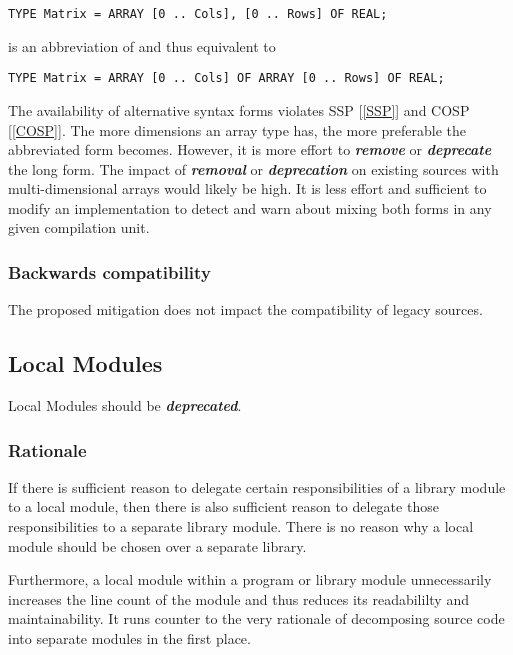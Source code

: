 \documentclass[10pt,a4paper]{article}
\renewcommand{\emph}[1]{\textbf{\textit{#1}}}
\begin{document}
\lstset{style=modula2}
\begin{lstlisting}
TYPE Matrix = ARRAY [0 .. Cols], [0 .. Rows] OF REAL;
\end{lstlisting}

\noindent is an abbreviation of and thus equivalent to 
\lstset{style=modula2}
\begin{lstlisting}
TYPE Matrix = ARRAY [0 .. Cols] OF ARRAY [0 .. Rows] OF REAL;
\end{lstlisting}

\par\noindent The availability of alternative syntax forms violates
SSP [\ref{SSP}] and COSP [\ref{COSP}]. The more dimensions an array type has,
the more preferable the abbreviated form becomes. However, it is more effort
to \emph{remove} or \emph{deprecate} the long form. The impact of
\emph{removal} or \emph{deprecation} on existing sources with
multi-dimensional arrays would likely be high. It is less effort and
sufficient to modify an implementation to detect and warn about mixing
both forms in any given compilation unit.

\subsubsection{Backwards compatibility}

The proposed mitigation does not impact the compatibility of legacy sources.


\subsection{Local Modules}

Local Modules should be \emph{deprecated}.

\subsubsection{Rationale}
If there is sufficient reason to delegate certain responsibilities of a library
module to a local module, then there is also sufficient reason to delegate
those responsibilities to a separate library module. There is no reason why a
local module should be chosen over a separate library.

Furthermore, a local module within a program or library module unnecessarily
increases the line count of the module and thus reduces its readabililty and
maintainability. It runs counter to the very rationale of decomposing source
code into separate modules in the first place.
\end{document}
